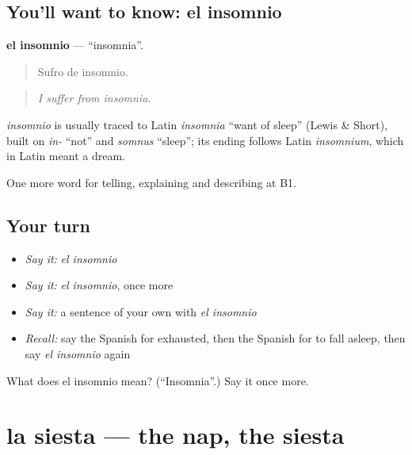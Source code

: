 \subsection*{You'll want to know: el insomnio}
\textbf{el insomnio} — \textquotedblleft{}insomnia\textquotedblright{}.

\begin{quote}
Sufro de insomnio.
\end{quote}

\begin{quote}
\emph{I suffer from insomnia.}
\end{quote}

\begin{cousinweb}
\emph{insomnio} is usually traced to Latin \emph{insomnia} \textquotedblleft{}want of sleep\textquotedblright{} (Lewis \& Short), built on \emph{in-} \textquotedblleft{}not\textquotedblright{} and \emph{somnus} \textquotedblleft{}sleep\textquotedblright{}; its ending follows Latin \emph{insomnium}, which in Latin meant a dream.
\end{cousinweb}

\begin{grammarlens}[title={What you've built}]
One more word for telling, explaining and describing at B1.
\end{grammarlens}

\subsection*{Your turn}
\begin{itemize}
\raggedright
  \item \emph{Say it:} \emph{el insomnio}
  \item \emph{Say it:} \emph{el insomnio}, once more
  \item \emph{Say it:} a sentence of your own with \emph{el insomnio}
  \item \emph{Recall:} say the Spanish for exhausted, then the Spanish for to fall asleep, then say \emph{el insomnio} again
\end{itemize}

\begin{tcolorbox}[breakable,colback=teal!4,colframe=teal!35!black,title={Before you move on}]
What does el insomnio mean? (\textquotedblleft{}Insomnia\textquotedblright{}.) Say it once more.
\end{tcolorbox}
\section[la siesta]{la siesta — the nap, the siesta}

